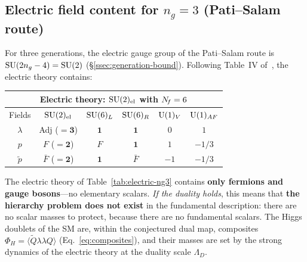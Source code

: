 \documentclass[11pt,a4paper]{article}
\begin{document}
\subsection{Electric field content for $n_g = 3$ (Pati--Salam route)}

For three generations, the electric gauge group of the Pati--Salam route
is $\mathrm{SU}(2n_g - 4) = \mathrm{SU}(2)$ (\S\ref{ssec:generation-bound}).  Following
Table~IV of~\cite{Sannino2011}, the electric theory contains:

\begin{center}
\renewcommand{\arraystretch}{1.3}
\begin{tabular}{c c c c c c}
\toprule
\multicolumn{6}{c}{\textbf{Electric theory: $\mathrm{SU}(2)_{\mathrm{el}}$ with $N_{\!f} = 6$}} \\
\midrule
Fields & $\mathrm{SU}(2)_{\text{el}}$ & $\mathrm{SU}(6)_L$ & $\mathrm{SU}(6)_R$ & $\mathrm{U}(1)_V$ & $\mathrm{U}(1)_{AF}$ \\
\midrule
$\lambda$ & Adj ($= \mathbf{3}$) & $\mathbf{1}$ & $\mathbf{1}$ & $0$ & $1$ \\
$p$       & $F$ ($= \mathbf{2}$) & $F$ & $\mathbf{1}$ & $1$  & $-1/3$ \\
$\widetilde{p}$ & $\bar{F}$ ($= \mathbf{2}$) & $\mathbf{1}$ & $\bar{F}$ & $-1$ & $-1/3$ \\
\bottomrule
\end{tabular}
\label{tab:electric-ng3}
\end{center}

\begin{remark}
  The electric theory of Table~\ref{tab:electric-ng3} contains
  \textbf{only fermions and gauge bosons}---no elementary scalars.
  \emph{If the duality holds}, this means that \textbf{the hierarchy
  problem does not exist} in the fundamental description: there are no
  scalar masses to protect, because there are no fundamental scalars.
  The Higgs doublets of the SM are, within the conjectured dual map, composites
  $\Phi_H = \langle \widetilde{Q}\lambda\lambda Q \rangle$
  (Eq.~\eqref{eq:composites}), and their masses are set by the strong
  dynamics of the electric theory at the duality scale $\Lambda_D$.
\end{remark}
\end{document}
